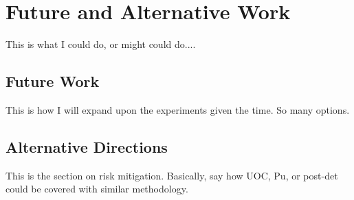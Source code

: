 \chapter{Future and Alternative Work}
\label{ch:future}

This is what I could do, or might could do....

\section{Future Work}
\label{sec:expand}

This is how I will expand upon the experiments given the time.  So many
options.

\section{Alternative Directions}
\label{sec:riskmitig}

This is the section on risk mitigation. Basically, say how \gls{UOC}, Pu, or
post-det could be covered with similar methodology.
